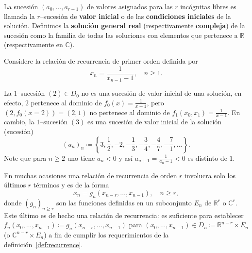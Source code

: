 La sucesión $\left(a_{0},\ldots,a_{r-1}\right)$ de valores asignados para las $r$ incógnitas libres es llamada la $r$--sucesión de \textbf{valor inicial} o de las \textbf{condiciones iniciales} de la solución. Definimos la \textbf{solución general real} (respectivamente \textbf{compleja}) de la sucesión como la familia de todas las soluciones con elementos que pertenece a $\mathds{R}$ (respectivamente en $\mathds{C}$).

\begin{example}
	Considere la relación de recurrencia de primer orden definida por \[x_{n}=\frac{1}{x_{n-1}-1},\quad n\geq1.\]

	La $1$--sucesión $\left(2\right)\in D_{0}$ no es una sucesión de valor inicial de una solución, en efecto, $2$ pertenece al dominio de $f_{0}\left(x\right)=\frac{1}{x-1}$, pero $\left(2,f_{0}(x=2)\right)=\left(2,1\right)$ no pertenece al dominio de $f_{1}\left(x_{0},x_{1}\right)=\frac{1}{x-1}$. En cambio, la $1$--sucesión $\left(3\right)$ es una sucesión de valor inicial de la solución (sucesión) \[ {\left(a_{n}\right)}_{n}\coloneqq\left\{3,\frac{1}{2},-2,-\frac{1}{3},-\frac{3}{4},-\frac{4}{7},-\frac{7}{1},\ldots\right\}. \] Note que para $n\geq2$ uno tiene $a_{n}<0$ y así $a_{n+1}=\frac{1}{a_{n}-1}<0$ es distinto de $1$.
\end{example}

\begin{example}
	En muchas ocasiones una relación de recurrencia de orden $r$ involucra solo los últimos $r$ términos y es de la forma	\[ x_{n}=g_{n}\left(x_{n-r},\ldots,x_{n-1}\right),\quad n\geq r, \] donde ${\left(g_{n}\right)}_{n\geq r}$ son las funciones definidas en un subconjunto $E_{n}$ de $\mathds{R}^{r}$ o $\mathds{C}^{r}$. Este último es de hecho una relación de recurrencia: es suficiente para establecer $f_{n}\left(x_{0},\ldots,x_{n-1}\right)\coloneqq g_{n}\left(x_{n-r},\ldots,x_{n-1}\right)$ para $\left(x_{0},\ldots,x_{n-1}\right)\in D_{n}\coloneqq\mathds{R}^{n-r}\times E_{n}$ (o $\mathds{C}^{n-r}\times E_{n}$) a fin de cumplir los requerimientos de la definición~\eqref{def:recurrence}.
\end{example}


